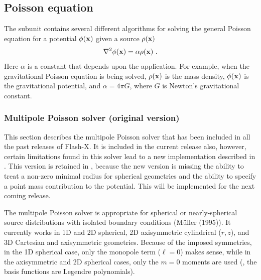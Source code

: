 \subsection{Poisson equation}
\label{Sec:GridSolversPoisson}

The  subunit contains several different algorithms
for solving the general Poisson equation for a potential $\phi({\bf
x})$ given a source $\rho({\bf x})$ 
\begin{equation}
\label{Eqn:general Poisson}
\nabla^2\phi({\bf x}) = \alpha\rho({\bf x})\ .
\end{equation}
Here $\alpha$ is a constant that depends upon the application.  For example,
when the gravitational Poisson equation is being solved, $\rho({\bf x})$ is
the mass density, $\phi({\bf x})$ is the gravitational potential, and
$\alpha = 4\pi G$, where $G$ is Newton's gravitational constant.







\subsubsection{Multipole Poisson solver (original version)}
\label{Sec:GridSolversMultipole}
This section describes the multipole Poisson solver that has been
included in all the past releases of Flash-X. It is included in the
current release also, however, certain limitations found in this
solver lead to a new implementation described in
. This version is retained in
\flashx, because the new version is missing 
the ability to treat a non-zero minimal radius for spherical
geometries and the ability to specify a point mass contribution to the
potential. This will be implemented for the next coming release. 

The multipole Poisson solver is appropriate for spherical or nearly-spherical
source distributions with isolated boundary conditions (M{\"u}ller (1995)).
It currently works in 1D and 2D spherical, 2D axisymmetric cylindrical ($r,z$), and
3D Cartesian and axisymmetric geometries. Because of the imposed symmetries,
in the 1D spherical case, only the monopole term ($\ell = 0$) makes sense,
while in the axisymmetric and 2D spherical cases, only the $m = 0$ moments are used (\ie, the
basis functions are Legendre polynomials).

